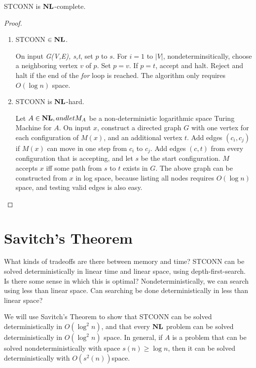 \begin{Thm} STCONN is $\nl$-complete.
\end{Thm}

\begin{proof}
\begin{enumerate}
\item STCONN $\in \nl$.

    On input {\it G(V,E), s,t}, set $p$ to $s$.
    For $i = 1$ to $|V|$, nondeterminsitically, choose a neighboring
    vertex $v$ of $p$.  Set $p = v$. If $p = t$, accept and halt.
    Reject and halt if the end of the {\em for} loop is reached. 
    The algorithm only requires
    $O(\log{n})$ space.

\item STCONN is $\nl$-hard.
    
    Let $A \in \nl, and let M_A$ be a non-deterministic logarithmic
    space Turing Machine for $A$.  On input $x$,
    construct a directed graph $G$ with one vertex for each
    configuration of $M(x)$, and an additional vertex $t$.  Add edges
    $(c_i, c_j)$ if $M(x)$ can move in one step from $c_i$ to $c_j$.
    Add edges $(c ,t)$ from every configuration that is accepting, and
    let $s$ be the start configuration.  $M$ accepts $x$ iff some path
    from $s$ to $t$ exists in $G$.  The above graph can be
    constructed from $x$ in log space, because listing all nodes
    requires $O(\log{n})$ space, and testing valid edges is also easy.
\end{enumerate}
\end{proof}



\section{Savitch's Theorem}
What kinds of tradeoffs are there between memory and time?  STCONN can
be solved deterministically in linear time and linear space, using
depth-first-search.  Is there some sense in which this is optimal?
Nondeterministically, we can search using less than linear space.  Can
searching be done deterministically in less than linear space?

We will use Savitch's Theorem to show that STCONN can be solved
deterministically in $O(\log^{2}{n})$, and that every $\nl$ problem
can be solved deterministically in $O(\log^{2}{n})$ space.  In
general, if $A$ is a problem that can be solved nondeterministically
with space $s(n) \geq \log{n}$, then it can be solved
deterministically with $O(s^2(n))$space.

